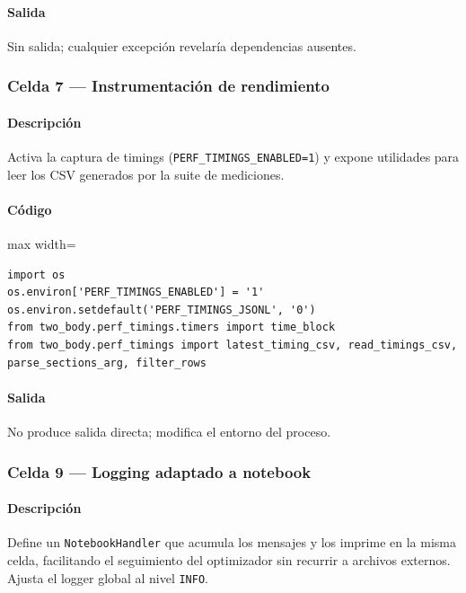 \paragraph{Salida} Sin salida; cualquier excepción revelaría dependencias ausentes.

\subsubsection*{Celda 7 — Instrumentación de rendimiento}
\paragraph{Descripción} Activa la captura de timings (\texttt{PERF\_TIMINGS\_ENABLED=1}) y expone utilidades para leer los CSV generados por la suite de mediciones.
\paragraph{Código}
\begin{listing}[H]
\caption{Celda 7: configuración de \texttt{perf\_timings}}
\label{lst:c04_cell07}
\begin{adjustbox}{max width=\textwidth}
\begin{minipage}{\textwidth}
\begin{verbatim}
import os
os.environ['PERF_TIMINGS_ENABLED'] = '1'
os.environ.setdefault('PERF_TIMINGS_JSONL', '0')
from two_body.perf_timings.timers import time_block
from two_body.perf_timings import latest_timing_csv, read_timings_csv, parse_sections_arg, filter_rows
\end{verbatim}
\end{minipage}
\end{adjustbox}
\end{listing}
\paragraph{Salida} No produce salida directa; modifica el entorno del proceso.

\subsubsection*{Celda 9 — Logging adaptado a notebook}
\paragraph{Descripción} Define un \texttt{NotebookHandler} que acumula los mensajes y los imprime en la misma celda, facilitando el seguimiento del optimizador sin recurrir a archivos externos. Ajusta el logger global al nivel \texttt{INFO}.
